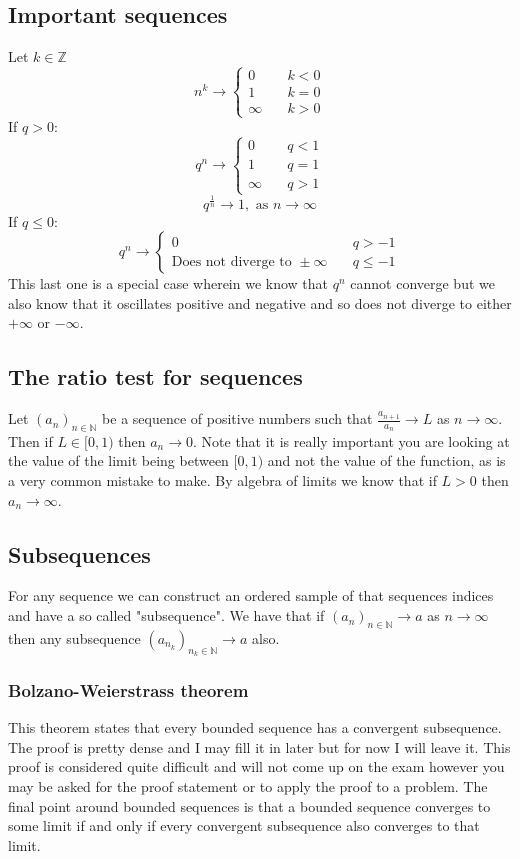 \documentclass[12pt]{article}
\newcommand{\seq}[2]{(#1_#2)_{#2\in\mathbb{N}}}
\begin{document}
\subsection*{Important sequences}
Let \(k\in\mathbb{Z}\)
\[n^k\to\begin{cases}
    0&\quad k<0 \\
    1&\quad k=0 \\
    \infty&\quad k>0
\end{cases}\]
If \(q>0\):
\[q^n\to\begin{cases}
    0&\quad q<1 \\
    1&\quad q=1 \\
    \infty&\quad q>1
\end{cases}\]
\[q^\frac{1}{n}\to 1,\text{ as }n\to\infty\]
If \(q\leq 0\):
\[q^n\to\begin{cases}
    0&\quad q>-1\\
    \text{Does not diverge to }\pm\infty&\quad q\leq-1
\end{cases}\]
This last one is a special case wherein we know that \(q^n\) cannot converge but we also know that it oscillates positive and negative and so does not diverge to either \(+\infty\) or \(-\infty\).
\subsection*{The ratio test for sequences}
Let \(\seq{a}{n}\) be a sequence of positive numbers such that \(\frac{a_{n+1}}{a_n}\to L\) as \(n\to\infty\). Then if \(L\in[0,1)\) then \(a_n\to 0\). Note that it is really important you are looking at the value of the limit being between \([0,1)\) and not the value of the function, as is a very common mistake to make. By algebra of limits we know that if \(L>0\) then \(a_n\to\infty\).
\subsection*{Subsequences}
For any sequence we can construct an ordered sample of that sequences indices and have a so called "subsequence". We have that if \(\seq{a}{n}\to a\) as \(n\to\infty\) then any subsequence \(\seq{a}{{n_k}}\to a\) also.
\subsubsection*{Bolzano-Weierstrass theorem}
This theorem states that every bounded sequence has a convergent subsequence. The proof is pretty dense and I may fill it in later but for now I will leave it. This proof is considered quite difficult and will not come up on the exam however you may be asked for the proof statement or to apply the proof to a problem. The final point around bounded sequences is that a bounded sequence converges to some limit if and only if every convergent subsequence also converges to that limit.
\end{document}
